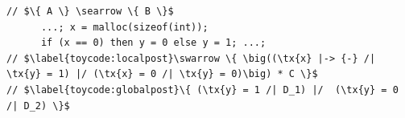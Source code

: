 \documentclass[acmsmall,screen]{acmart}  %
\newcommand{\li}[1]{{\texttt{\small #1}}} %
\newcommand{\defeq}{\mathbin{\stackrel{\triangle}{=}}} %
\newcommand{\tx}[1]{\text{#1}}
\newcommand{\p}[1]{\ensuremath{\mathsf{#1}}} \newcommand{\m}[1]{\ensuremath{\mathit{#1}}} \newcommand{\ma}[1]{\ensuremath{\mathcal{#1}}} \let\ramify\lightning
\newcommand{\infrulestyle}[1]{\textsc{#1}}
\newcommand{\infrule}[4]{\inferrule*[lab=\infrulestyle{#1},right=$\mathrlap{#4}$]{#2}{#3}}
\begin{document}


\begin{lstlisting}
// $\{ A \} \searrow \{ B \}$
      ...; x = malloc(sizeof(int));
      if (x == 0) then y = 0 else y = 1; ...;
// $\label{toycode:localpost}\swarrow \{ \big((\tx{x} |-> {-} /| \tx{y} = 1) |/ (\tx{x} = 0 /| \tx{y} = 0)\big) * C \}$
// $\label{toycode:globalpost}\{ (\tx{y} = 1 /| D_1) |/  (\tx{y} = 0 /| D_2) \}$
\end{lstlisting}
\end{document}

